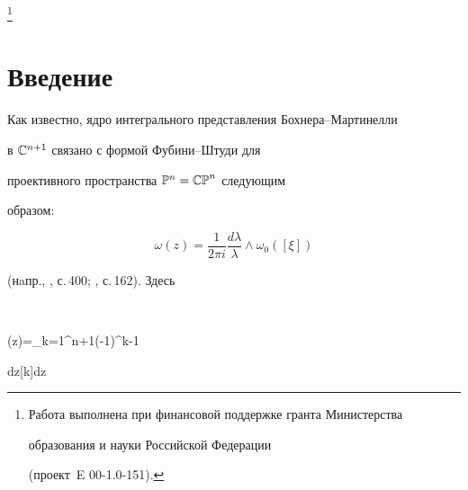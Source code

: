 \thanks{Работа выполнена при финансовой поддержке гранта Министерства


образования и науки Российской Федерации


(проект \No\,E 00-1.0-151).}





\date{}




\pagestyle{plain} %







\maketitle


\label{begin}











\section*{Введение} 





Как известно, ядро интегрального представления Бохнера--Мартинелли


в ${\Bbb C}^{n+1}$ связано с формой Фубини--Штуди для


проективного пространства $\Bbb{P}^n=\Bbb{CP}^n$ следующим


образом:


\begin{equation}


\omega(z)=\frac1{2\pi


i}\frac{d\lambda}{\lambda}\wedge\omega_0([\xi]) \label{svjaz1}


\end{equation}


(нaпр., \cite{GH}, с.\,400; \cite{Kyt}, с.\,162). Здесь





$$ 


\omega(z)=\sum_{k=1}^{n+1}(-1)^{k-1}


d\ov z[k]\wedge dz


